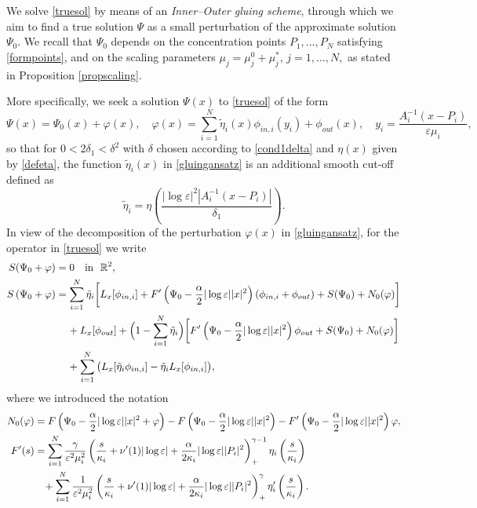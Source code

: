 \documentclass[11pt,reqno,a4paper]{amsart}
\numberwithin{equation}{section}
\newcommand{\R}{\mathbb{R}}
\newcommand{\inn}{{\quad\hbox{in } }}
\newcommand{\ve}{\varepsilon}
\begin{document}
We solve \eqref{truesol} by means of an \emph{Inner–Outer gluing scheme}, through which we aim to find a true solution $\Psi$ as a small perturbation of the approximate solution $\Psi_0$. We recall that $\Psi_0$ depends on the concentration points $P_1,\dots,P_N$ satisfying   \eqref{formpoints}, and on the scaling parameters $\mu_j=\mu_j^{0}+\mu_j^{*}, \, j=1,\dots,N,$ as stated in Proposition \ref{propscaling}.

More specifically,
we seek a solution $\Psi(x)$
to \eqref{truesol} of the form
\begin{equation}\label{gluingansatz}
\Psi(x)=\Psi_0(x)+\varphi(x), \quad \varphi(x)=\sum_{i=1}^{N}\tilde{\eta}_i(x)\phi_{in,i}(y_i) +\phi_{out}(x), \quad y_i=\frac{A_i^{-1}(x-P_i)}{\ve\mu_i},
\end{equation}
so that for $0<2\delta_1<\delta^2$ with $\delta$ chosen according to \eqref{cond1delta} and $\eta(x)$ given by \eqref{defeta}, the function $\tilde{\eta}_{i}(x)$ in \eqref{gluingansatz} is an additional smooth cut-off defined as
\begin{equation}\label{cutoffgluing}
\tilde{\eta}_i=\eta\left(\frac{|\log\ve|^2|A_i^{-1}(x-P_i)|}{\delta_1}\right).
\end{equation}
In view of the decomposition of the perturbation $\varphi(x)$ in \eqref{gluingansatz}, for the operator in \eqref{truesol} we write 
\begin{equation}\nonumber
\begin{aligned}
S(\Psi_0+\varphi)
 &=0 \inn \,\,\R^2,\\
 S\left(\Psi_0+\varphi\right)&=\sum_{i=1}^N\tilde{\eta}_i\bigg[L_x[\phi_{in,i}]
 +F'\left(\Psi_0-\frac{\alpha}{2}|\log\ve||x|^2\right)(\phi_{in,i}+\phi_{out})
 +S(\Psi_0)
 +N_0(\varphi)\bigg]   \\
&\hspace{4mm} + L_x[\phi_{out}]+\Big(1-\sum_{i=1}^N\tilde{\eta}_i\Big)
\bigg[F'\left(\Psi_0-\frac{\alpha}{2}|\log\ve||x|^2\right)\phi_{out}+S(\Psi_0)
 +N_0(\varphi)\bigg] \\
&\hspace{4mm} + \sum_{i=1}^N\big(L_x[\tilde{\eta}_i\phi_{in,i}]-\tilde{\eta}_iL_x[\phi_{in,i}]\big),
\end{aligned}
\end{equation}
where we introduced the notation
\begin{equation}\label{nol}
\begin{aligned}
 N_{0}(\varphi) &=F\left(\Psi_0-\frac{\alpha}{2}|\log\ve||x|^2+\varphi\right)-F\left(\Psi_0-\frac{\alpha}{2}|\log\ve||x|^2\right)-F'\left(\Psi_0-\frac{\alpha}{2}|\log\ve||x|^2\right)\varphi,\\
 F'(s)&=\sum_{i=1}^N\frac{\gamma}{\ve^2\mu_i^2}\left(\frac{s}{\kappa_i}+\nu'(1)|\log\ve|+\frac{\alpha}{2\kappa_i}|\log\ve||P_i|^2\right)^{\gamma-1}_{+}\eta_{i}\left(\frac{s}{\kappa_i}\right)\\
 &\hspace{3mm}+\sum_{i=1}^{N}\frac{1}{\ve^2\mu_i^2}\left(\frac{s}{\kappa_i}+\nu'(1)|\log\ve|+\frac{\alpha}{2\kappa_i}|\log\ve||P_i|^2\right)^{\gamma}_{+}\eta'_{i}\left(\frac{s}{\kappa_i}\right).  
\end{aligned}
\end{equation}
\end{document}
